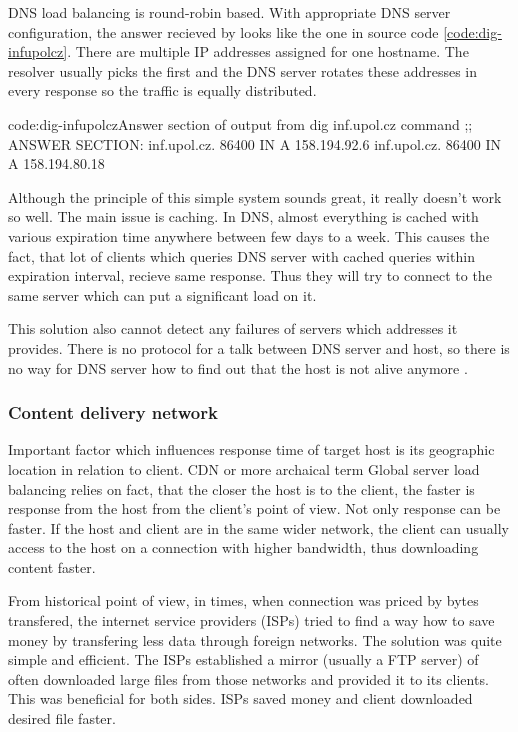 \documentclass[
  master,
  biblatex,
  glossaries,
  index
]{kidiplom}
\begin{document}
DNS load balancing is round-robin based. With appropriate DNS server configuration, the answer recieved by  looks like the one in source code \ref{code:dig-infupolcz}. There are multiple IP addresses assigned for one hostname. The resolver usually picks the first and the DNS server rotates these addresses in every response so the traffic is equally distributed.

\begin{kicode}{}{code:dig-infupolcz}{Answer section of output from dig inf.upol.cz command}
;; ANSWER SECTION:
inf.upol.cz.		86400	IN	A	158.194.92.6
inf.upol.cz.		86400	IN	A	158.194.80.18
\end{kicode}

Although the principle of this simple system sounds great, it really doesn't work so well. The main issue is caching. In DNS, almost everything is cached with various expiration time anywhere between few days to a week. This causes the fact, that lot of clients which queries DNS server with cached queries within expiration interval, recieve same response. Thus they will try to connect to the same server which can put a significant load on it.

This solution also cannot detect any failures of servers which addresses it provides. There is no protocol for a talk between DNS server and host, so there is no way for DNS server how to find out that the host is not alive anymore \cite{bib:slb}\cite{bib:practicallb}.

\subsubsection{Content delivery network}

Important factor which influences response time of target host is its geographic location in relation to client. CDN or more archaical term Global server load balancing\cite{bib:slb} relies on fact, that the closer the host is to the client, the faster is response from the host from the client's point of view. Not only response can be faster. If the host and client are in the same wider network, the client can usually access to the host on a connection with higher bandwidth, thus downloading content faster\cite{bib:practicallb}.

From historical point of view, in times, when connection was priced by bytes transfered, the internet service providers (ISPs) tried to find a way how to save money by transfering less data through foreign networks. The solution was quite simple and efficient. The ISPs established a mirror (usually a FTP server) of often downloaded large files from those networks and provided it to its clients. This was beneficial for both sides. ISPs saved money and client downloaded desired file faster.
\end{document}
